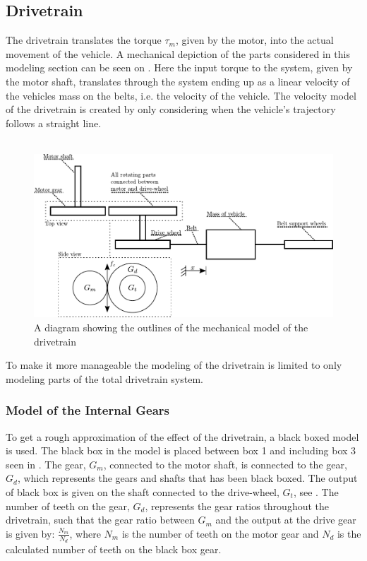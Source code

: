 \subsection{Drivetrain}\label{DriveTrain}
The drivetrain translates the torque $\tau_m$, given by the motor, into the actual movement of the vehicle. A mechanical depiction of the parts considered in this modeling section can be seen on . Here the input torque to the system, given by the motor shaft, translates through the system ending up as a linear velocity of the vehicles mass on the belts, i.e. the velocity of the vehicle. The velocity model of the drivetrain is created by only considering when the vehicle's trajectory follows a straight line.\\\\

\begin{figure}[H]
	\centering
	\includegraphics[scale=0.8]{figures/mechanicalDrawingSystem.pdf}
	\caption{A diagram showing the outlines of the mechanical model of the drivetrain}
	\label{fig:DrivetrainMechanicalModel}
\end{figure}

To make it more manageable the modeling of the drivetrain is limited to only modeling parts of the total drivetrain system.

\subsubsection{Model of the Internal Gears}\label{BlackBoxModel}
To get a rough approximation of the effect of the drivetrain, a black boxed model is used. The black box in the model is placed between box 1 and including box 3 seen in  . The gear, $G_m$, connected to the motor shaft, is connected to the gear, $G_d$, which represents the gears and shafts that has been black boxed. The output of black box is given on the shaft connected to the drive-wheel, $G_t$, see . The number of teeth on the gear, $G_d$, represents the gear ratios throughout the drivetrain, such that the gear ratio between $G_m$ and the output at the drive gear is given by: $\frac{N_m}{N_d}$, where $N_m$ is the number of teeth on the motor gear and $N_d$ is the calculated number of teeth on the black box gear.

